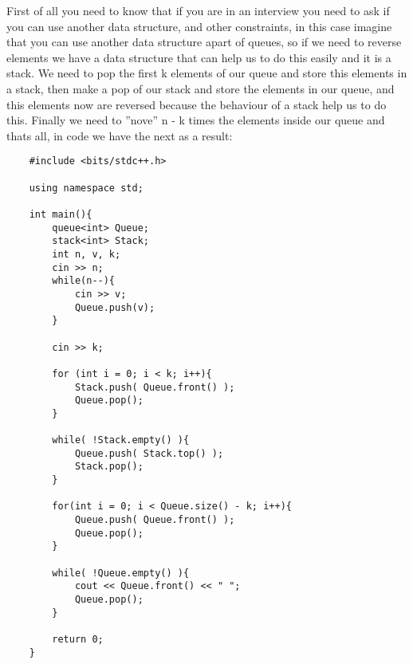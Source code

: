 First of all you need to know that if you are in an interview you need to ask if you can use another data structure, and other constraints, in this case imagine that you can use another data structure apart of queues, so if we need to reverse elements we have a data structure that can help us to do this easily and it is a stack.
We need to pop the first k elements of our queue and store this elements in a stack, then make a pop of our stack and store the elements in our queue, and this elements now are reversed because the behaviour of a stack help us to do this. Finally we need to ''nove'' n - k times the elements inside our queue and thats all, in code we have the next as a result:
\begin{lstlisting}
    #include <bits/stdc++.h>

    using namespace std;

    int main(){
        queue<int> Queue;
        stack<int> Stack;
        int n, v, k;
        cin >> n;
        while(n--){
            cin >> v;
            Queue.push(v);
        }

        cin >> k;

        for (int i = 0; i < k; i++){
            Stack.push( Queue.front() );
            Queue.pop();
        }

        while( !Stack.empty() ){
            Queue.push( Stack.top() );
            Stack.pop();
        }

        for(int i = 0; i < Queue.size() - k; i++){
            Queue.push( Queue.front() );
            Queue.pop();
        }

        while( !Queue.empty() ){
            cout << Queue.front() << " ";
            Queue.pop();
        }
        
        return 0;
    }
\end{lstlisting}